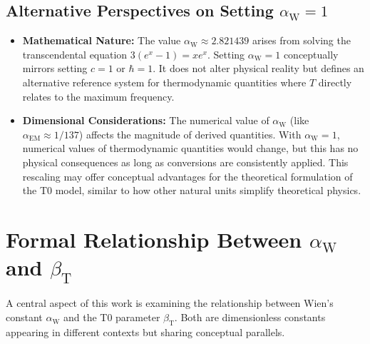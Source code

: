 \documentclass[12pt,a4paper]{article}
\newcommand{\betaT}{\beta_{\text{T}}}
\newcommand{\alphaEM}{\alpha_{\text{EM}}}
\newcommand{\alphaW}{\alpha_{\text{W}}}
\begin{document}
	\subsection{Alternative Perspectives on Setting \(\alphaW = 1\)}
	
	\begin{itemize}
		\item \textbf{Mathematical Nature:} The value \(\alphaW \approx 2.821439\) arises from solving the transcendental equation \(3(e^x - 1) = xe^x\). Setting \(\alphaW = 1\) conceptually mirrors setting \(c = 1\) or \(\hbar = 1\). It does not alter physical reality but defines an alternative reference system for thermodynamic quantities where \(T\) directly relates to the maximum frequency.
		\item \textbf{Dimensional Considerations:} The numerical value of \(\alphaW\) (like \(\alphaEM \approx 1/137\)) affects the magnitude of derived quantities. With \(\alphaW = 1\), numerical values of thermodynamic quantities would change, but this has no physical consequences as long as conversions are consistently applied. This rescaling may offer conceptual advantages for the theoretical formulation of the T0 model, similar to how other natural units simplify theoretical physics.
	\end{itemize}
	
	\section{Formal Relationship Between \(\alphaW\) and \(\betaT\)}
	
	A central aspect of this work is examining the relationship between Wien's constant \(\alphaW\) and the T0 parameter \(\betaT\). Both are dimensionless constants appearing in different contexts but sharing conceptual parallels.
	
\end{document}
